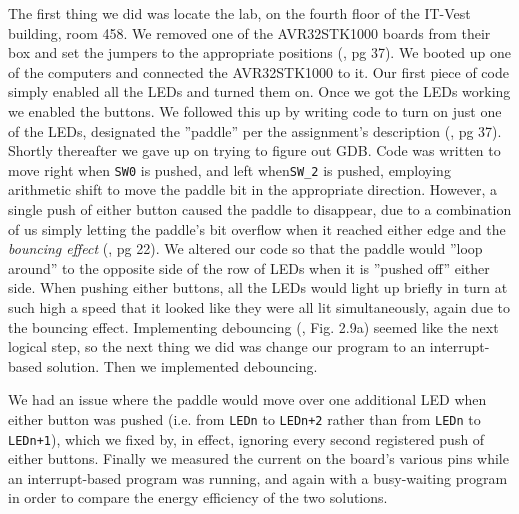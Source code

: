 The first thing we did was locate the lab, on the fourth floor of the IT-Vest building, room 458. 
We removed one of the AVR32STK1000 boards from their box and set the jumpers to the appropriate positions (\cite{lab-compendium}, pg 37).
We booted up one of the computers and connected the AVR32STK1000 to it. 
Our first piece of code simply enabled all the LEDs and turned them on. Once we got the LEDs working we enabled the buttons.
We followed this up by writing code to turn on just one of the LEDs, designated the ''paddle'' per the assignment's description (\cite{lab-compendium}, pg 37).
Shortly thereafter we gave up on trying to figure out GDB.
Code was written to move right when \texttt{SW0} is pushed, and left when\texttt{SW_2} is pushed, employing arithmetic shift to move the paddle bit in the appropriate direction.
However, a single push of either button caused the paddle to disappear, due to a combination of us simply letting the paddle's bit overflow when it reached either edge and the \emph{bouncing effect} (\cite{lab-compendium}, pg 22). We altered our code so that the paddle would ''loop around'' to the opposite side of the row of LEDs when it is ''pushed off'' either side.
When pushing either buttons, all the LEDs would light up briefly in turn at such high a speed that it looked like they were all lit simultaneously, again due to the bouncing effect.
Implementing debouncing (\cite{lab-compendium}, Fig. 2.9a) seemed like the next logical step, so the next thing we did was change our program to an interrupt-based solution.
Then we implemented debouncing.

We had an issue where the paddle would move over one additional LED when either button was pushed (i.e. from \texttt{LEDn} to \texttt{LEDn+2} rather than from \texttt{LEDn} to \texttt{LEDn+1}), which we fixed by, in effect, ignoring every second registered push of either buttons.
Finally we measured the current on the board's various pins while an interrupt-based program was running, and again with a busy-waiting program in order to compare the energy efficiency of the two solutions.
